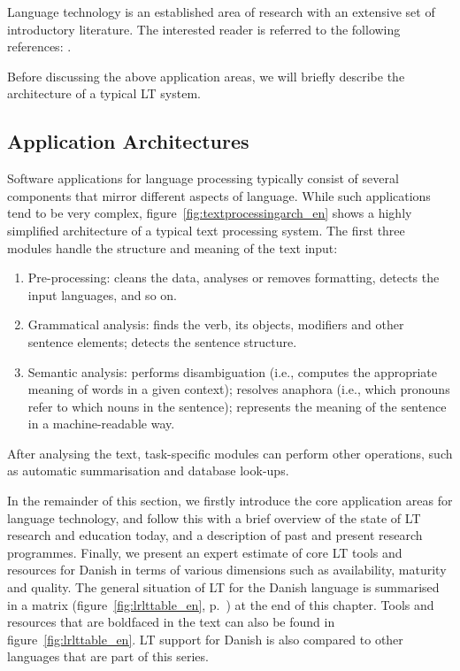 \begin{multicols}{2}
Language technology is an established area of research with an extensive set of introductory literature. The interested reader is referred to the following references:  \cite{Braasch, jurafsky-martin01, manning-schuetze1, lt-world1, lt-survey1}.

Before discussing the above application areas, we will briefly describe the architecture of a typical LT system.

\subsection{Application Architectures}

Software applications for language processing typically consist of several components that mirror different aspects of language. While such applications tend to be very complex, figure~\ref{fig:textprocessingarch_en} shows a highly simplified architecture of a typical text processing system. The first three modules handle the structure and meaning of the text input:

\begin{enumerate}
\item Pre-processing: cleans the data, analyses or removes formatting, detects the input languages, and so on.
\item Grammatical analysis: finds the verb, its objects, modifiers and other sentence elements; detects the sentence structure.
\item Semantic analysis: performs disambiguation (i.e., computes the appropriate meaning of words in a given context); resolves anaphora (i.e., which pronouns refer to which nouns in the sentence); represents the meaning of the sentence in a machine-readable way.
\end{enumerate}

After analysing the text, task-specific modules can perform other operations, such as automatic summarisation and database look-ups.

In the remainder of this section, we firstly introduce the core application areas for language technology, and follow this with a brief overview of the state of LT research and education today, and a description of past and present research programmes. Finally, we present an expert estimate of core LT tools and resources for Danish in terms of various dimensions such as availability, maturity and quality. The general situation of LT for the Danish language is summarised in a matrix (figure~\ref{fig:lrlttable_en}, p.~\pageref{fig:lrlttable_en}) at the end of this chapter. Tools and resources that are boldfaced in the text can also be found in figure~\ref{fig:lrlttable_en}. LT support for Danish is also compared to other languages that are part of this series.


\end{multicols}
